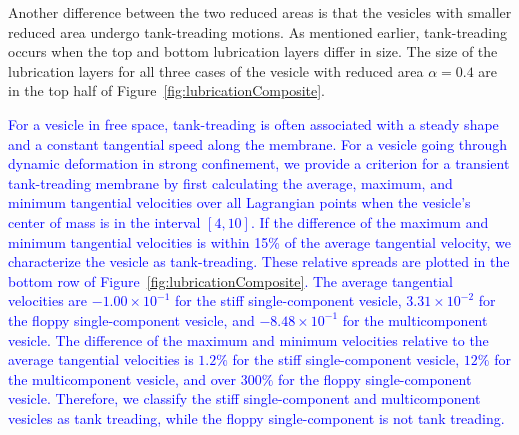 \documentclass[twoside,twocolumn,9pt]{article}
\begin{document}
Another difference between the two reduced areas is that the vesicles
with smaller reduced area undergo tank-treading motions. As mentioned
earlier, tank-treading occurs when the top and bottom lubrication layers
differ in size. The size of the lubrication layers for all three cases
of the vesicle with reduced area $\alpha = 0.4$ are in the top half of
Figure~\ref{fig:lubricationComposite}. 


\textcolor{blue}
{For a vesicle in free space, tank-treading is often associated with a steady shape and a constant tangential speed along the membrane.
For a vesicle going through dynamic deformation in strong confinement, we provide a criterion for a transient tank-treading membrane 
by first calculating
the average, maximum, and minimum tangential velocities over all
Lagrangian points when the vesicle's center of mass is in the interval
$[4,10]$. If the difference of the maximum and minimum tangential
velocities is within 15\% of the average tangential velocity, we
characterize the vesicle as tank-treading. These relative spreads are
plotted in the bottom row of Figure~\ref{fig:lubricationComposite}. The
average tangential velocities are $-1.00 \times 10^{-1}$ for the stiff
single-component vesicle, $3.31 \times 10^{-2}$ for the floppy
single-component vesicle, and $-8.48 \times 10^{-1}$ for the
multicomponent vesicle. The difference of the maximum and minimum
velocities relative to the average tangential velocities is $1.2\%$ for
the stiff single-component vesicle, $12\%$ for the multicomponent
vesicle, and over $300\%$ for the floppy single-component vesicle.
Therefore, we classify the stiff single-component and multicomponent
vesicles as tank treading, while the floppy single-component is not tank
treading.}
\end{document}
